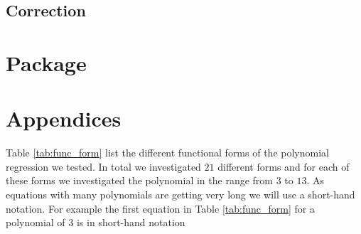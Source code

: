 \documentclass[12pt,a4paper]{article}
\begin{document}
\hypertarget{correction}{%
\subsection{Correction}\label{correction}}

\hypertarget{package}{%
\section{Package}\label{package}}

\pagebreak

\setcounter{page}{3}
\printbibliography[title = References]
\cleardoublepage

\begin{refsection}
\nocite{R-base}
\nocite{R-stargazer}
\nocite{R-stringr}
\nocite{R-tidyr}
\nocite{R-dplyr}
\nocite{R-glmnet}
\nocite{R-class}
\nocite{R-MASS}
\nocite{R-plm}
\nocite{R-leaps}
\nocite{R-caret}
\nocite{R-tree}
\nocite{R-gbm}
\nocite{R-plotmo}
\nocite{R-pls}
\nocite{R-splines}
\nocite{R-tictoc}
\nocite{R-plotly}
\nocite{R-inspectdf}
\nocite{R-rpart}
\nocite{R-rpart.plot}
\nocite{R-stargazer}
\nocite{R-knitr}
\nocite{R-purrr}
\nocite{R-randomForest}
\nocite{R-rstudioapi}





\nocite{R-Studio}

\printbibliography[title = Software-References]
\end{refsection}

\cleardoublepage
\appendix
\setcounter{table}{0}
\setcounter{figure}{0}
\renewcommand{\thetable}{A\arabic{table}}
\renewcommand{\thefigure}{A\arabic{figure}}


\hypertarget{appendices}{%
\section{Appendices}\label{appendices}}

Table \ref{tab:func_form} list the different functional forms of the
polynomial regression we tested. In total we investigated \(21\)
different forms and for each of these forms we investigated the
polynomial in the range from \(3\) to \(13\). As equations with many
polynomials are getting very long we will use a short-hand notation. For
example the first equation in Table \ref{tab:func_form} for a polynomial
of \(3\) is in short-hand notation
\end{document}

